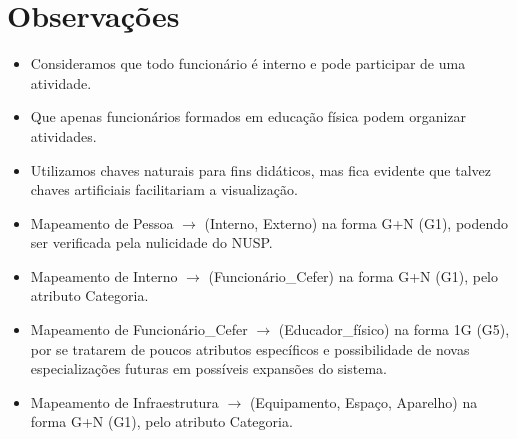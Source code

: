 \documentclass{article}
\begin{document}
\section*{Observações}
\begin{itemize}
    \item Consideramos que todo funcionário é interno e pode participar de uma atividade.
    \item Que apenas funcionários formados em educação física podem organizar atividades.
    \item Utilizamos chaves naturais para fins didáticos, mas fica evidente que talvez chaves artificiais facilitariam a visualização.
    \item Mapeamento de Pessoa $\rightarrow$ (Interno, Externo) na forma G+N (G1), podendo ser verificada pela nulicidade do NUSP.
    \item Mapeamento de Interno $\rightarrow$ (Funcionário\_Cefer) na forma G+N (G1), pelo atributo Categoria.
    \item Mapeamento de Funcionário\_Cefer $\rightarrow$ (Educador\_físico) na forma 1G (G5), por se tratarem de poucos atributos específicos e possibilidade de novas especializações futuras em possíveis expansões do sistema.
    \item Mapeamento de Infraestrutura $\rightarrow$ (Equipamento, Espaço, Aparelho) na forma G+N (G1), pelo atributo Categoria.
\end{itemize}
\end{document}
